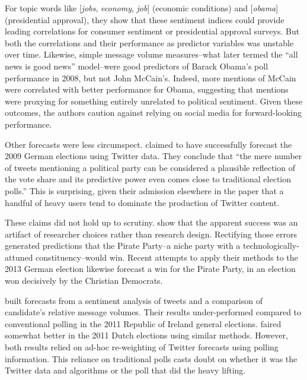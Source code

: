 \documentclass{article}
\begin{document}
For topic words like [\textit{jobs}, \textit{economy}, \textit{job}]
(economic conditions) and [\textit{obama}] (presidential approval),
they show that these sentiment indices could provide leading
correlations for consumer sentiment or presidential approval
surveys. But both the correlations and their performance as predictor
variables was unstable over time. Likewise, simple message volume
measures--what \citep{digrazia2013} later termed the ``all news is
good news'' model--were good predictors of Barack Obama's poll
performance in 2008, but not John McCain's. Indeed, more mentions of
McCain were correlated with better performance for Obama, suggesting
that mentions were proxying for something entirely unrelated
to political sentiment. Given these
outcomes, the authors caution against relying on social media for
forward-looking performance.

Other forecasts were less circumspect. \cite{tumasjan2010election}
claimed to have successfully forecast the 2009 German elections using
Twitter data. They conclude that ``the mere number of tweets
mentioning a political party can be considered a plausible reflection
of the vote share and its predictive power even comes close to
traditional election polls.'' This is surprising, given their
admission elsewhere in the paper that a handful of heavy users tend to
dominate the production of Twitter content. 

These claims did not hold up to scrutiny.
\cite{jungherr2012pirate} show that the apparent success was an
artifact of researcher choices rather than research design. Rectifying
those errors generated predictions that the Pirate Party--a niche
party with a technologically-attuned constituency--would win. Recent
attempts to apply their methods to the 2013 German election likewise
forecast a win for the Pirate Party, in an election won decisively by
the Christian Democrats.

\cite{bermingham2011using} built forecasts from a sentiment analysis
of tweets and a comparison of candidate's relative message
volumes. Their results under-performed compared to conventional
polling in the 2011 Republic of Ireland general
elections. \cite{sang2012predicting} faired somewhat better in the
2011 Dutch elections using similar methods. However, both results relied on ad-hoc
re-weighting of Twitter forecasts using polling information. This
reliance on traditional polls casts doubt on whether it was the
Twitter data and algorithms or the poll that did the heavy lifting.
\end{document}
